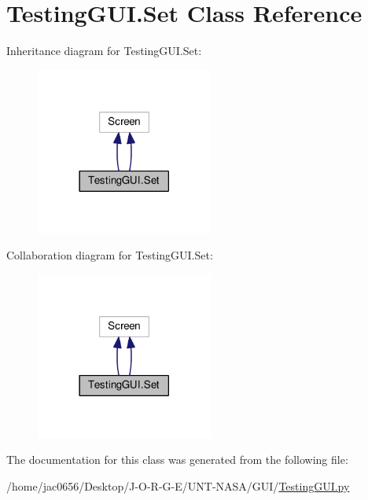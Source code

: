 \hypertarget{classTestingGUI_1_1Set}{}\section{Testing\+G\+U\+I.\+Set Class Reference}
\label{classTestingGUI_1_1Set}


Inheritance diagram for Testing\+G\+U\+I.\+Set\+:\nopagebreak
\begin{figure}[H]
\begin{center}
\leavevmode
\includegraphics[width=165pt]{classTestingGUI_1_1Set__inherit__graph}
\end{center}
\end{figure}


Collaboration diagram for Testing\+G\+U\+I.\+Set\+:\nopagebreak
\begin{figure}[H]
\begin{center}
\leavevmode
\includegraphics[width=165pt]{classTestingGUI_1_1Set__coll__graph}
\end{center}
\end{figure}


The documentation for this class was generated from the following file\+:\begin{DoxyCompactItemize}
\item 
/home/jac0656/\+Desktop/\+J-\/\+O-\/\+R-\/\+G-\/\+E/\+U\+N\+T-\/\+N\+A\+S\+A/\+G\+U\+I/\hyperlink{GUI_2TestingGUI_8py}{Testing\+G\+U\+I.\+py}\end{DoxyCompactItemize}
